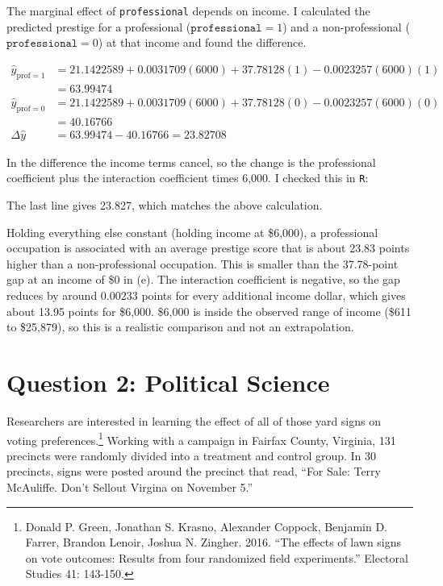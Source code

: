 \documentclass[12pt,letterpaper]{article}
\begin{document}
\begin{enumerate}
		\noindent The marginal effect of \texttt{professional} depends on income. I calculated the predicted prestige for a professional ($\texttt{professional} = 1$) and a non-professional ($\texttt{professional} = 0$) at that income and found the difference. 
		
		\begin{align*}
			\hat{y}_{\text{prof}=1} &= 21.1422589 + 0.0031709(6000) + 37.78128(1) - 0.0023257(6000)(1) \\
			&= 63.99474 \\
			\hat{y}_{\text{prof}=0} &= 21.1422589 + 0.0031709(6000) + 37.78128(0) - 0.0023257(6000)(0) \\
			&= 40.16766 \\
			\Delta\hat{y} &= 63.99474 - 40.16766 = 23.82708
		\end{align*}
		
		\noindent In the difference the income terms cancel, so the change is the professional coefficient plus the interaction coefficient times 6,000. I checked this in \texttt{R}:
		
	
	
	\noindent The last line gives 23.827, which matches the above calculation.
	
		\vspace{.05cm}
		\noindent Holding everything else constant (holding income at \$6,000), a professional occupation is associated with an average prestige score that is about 23.83 points higher than a non-professional occupation. This is smaller than the 37.78-point gap at an income of \$0 in (e). The interaction coefficient is negative, so the gap reduces by around 0.00233 points for every additional income dollar, which gives about 13.95 points for \$6,000.  \$6,000 is inside the observed range of income (\$611 to \$25,879), so this is a realistic comparison and not an extrapolation.
		
	\end{enumerate}
	
	\newpage
	
	\section*{Question 2: Political Science}
	\vspace{.25cm}
	\noindent 	Researchers are interested in learning the effect of all of those yard signs on voting preferences.\footnote{Donald P. Green, Jonathan	S. Krasno, Alexander Coppock, Benjamin D. Farrer,	Brandon Lenoir, Joshua N. Zingher. 2016. ``The effects of lawn signs on vote outcomes: Results from four randomized field experiments.'' Electoral Studies 41: 143-150. } Working with a campaign in Fairfax County, Virginia, 131 precincts were randomly divided into a treatment and control group. In 30 precincts, signs were posted around the precinct that read, ``For Sale: Terry McAuliffe. Don't Sellout Virgina on November 5.'' \\
	
\end{document}
